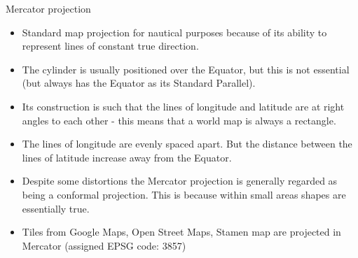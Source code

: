 \documentclass[11pt,dvipsnames,ignorenonframetext,aspectratio=169]{beamer}
\providecommand{\tightlist}{%
  \setlength{\itemsep}{0pt}\setlength{\parskip}{0pt}}
\begin{document}
\begin{frame}{Mercator projection}
\protect\hypertarget{mercator-projection}{}
\small

\begin{itemize}
\tightlist
\item
  Standard map projection for nautical purposes because of its ability
  to represent lines of constant true direction.
\item
  The cylinder is usually positioned over the Equator, but this is not
  essential (but always has the Equator as its Standard Parallel).
\item
  Its construction is such that the lines of longitude and latitude are
  at right angles to each other - this means that a world map is always
  a rectangle.
\item
  The lines of longitude are evenly spaced apart. But the distance
  between the lines of latitude increase away from the Equator.
\item
  Despite some distortions the Mercator projection is generally regarded
  as being a conformal projection. This is because within small areas
  shapes are essentially true.
\item
  Tiles from Google Maps, Open Street Maps, Stamen map are projected in
  Mercator (assigned EPSG code: 3857)
\end{itemize}
\end{frame}
\end{document}
